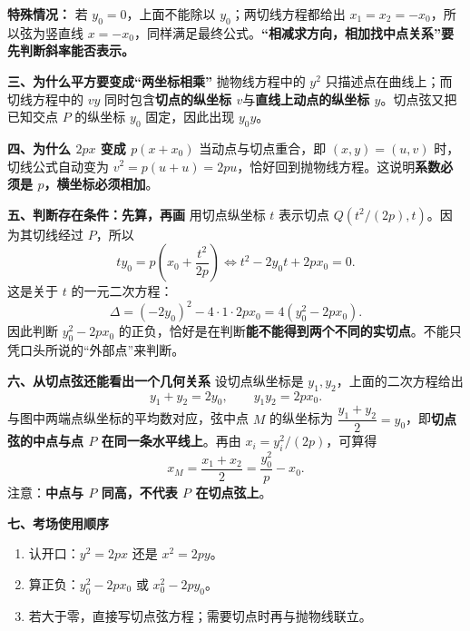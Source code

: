 \begin{explanationbox}
\textbf{特殊情况：} 若 $y_0=0$，上面不能除以 $y_0$；两切线方程都给出 $x_1=x_2=-x_0$，所以弦为竖直线 $x=-x_0$，同样满足最终公式。\textbf{“相减求方向，相加找中点关系”要先判断斜率能否表示。}

\textbf{\textcolor{CExplanation}{三、为什么平方要变成“两坐标相乘”}}
抛物线方程中的 $y^2$ 只描述点在曲线上；而切线方程中的 $vy$ 同时包含\textbf{切点的纵坐标 $v$}与\textbf{直线上动点的纵坐标 $y$}。切点弦又把已知交点 $P$ 的纵坐标 $y_0$ 固定，因此出现 $y_0y$。

\medskip
\textbf{\textcolor{CExplanation}{四、为什么 $2px$ 变成 $p(x+x_0)$}}
当动点与切点重合，即 $(x,y)=(u,v)$ 时，切线公式自动变为 $v^2=p(u+u)=2pu$，恰好回到抛物线方程。这说明\textbf{系数必须是 $p$，横坐标必须相加}。

\medskip
\textbf{\textcolor{CExplanation}{五、判断存在条件：先算，再画}}
用切点纵坐标 $t$ 表示切点 $Q(t^2/(2p),t)$。因为其切线经过 $P$，所以
\[
 t y_0=p\left(x_0+\frac{t^2}{2p}\right)
 \iff t^2-2y_0t+2px_0=0.
\]
这是关于 $t$ 的一元二次方程：
\[
\Delta=(-2y_0)^2-4\cdot 1\cdot 2px_0
=4(y_0^2-2px_0).
\]
因此判断 $y_0^2-2px_0$ 的正负，恰好是在判断\textbf{能不能得到两个不同的实切点}。不能只凭口头所说的“外部点”来判断。

\medskip
\textbf{\textcolor{CExplanation}{六、从切点弦还能看出一个几何关系}}
设切点纵坐标是 $y_1,y_2$，上面的二次方程给出
\[
 y_1+y_2=2y_0,\qquad y_1y_2=2px_0.
\]
与图中两端点纵坐标的平均数对应，弦中点 $M$ 的纵坐标为 $\dfrac{y_1+y_2}{2}=y_0$，即\textbf{切点弦的中点与点 $P$ 在同一条水平线上}。再由 $x_i=y_i^2/(2p)$，可算得
\[
 x_M=\frac{x_1+x_2}{2}=\frac{y_0^2}{p}-x_0.
\]
注意：\textbf{中点与 $P$ 同高，不代表 $P$ 在切点弦上}。

\medskip
\textbf{\textcolor{CExplanation}{七、考场使用顺序}}
\begin{enumerate}[leftmargin=*,itemsep=0.3em]
\item 认开口：$y^2=2px$ 还是 $x^2=2py$。
\item 算正负：$y_0^2-2px_0$ 或 $x_0^2-2py_0$。
\item 若大于零，直接写切点弦方程；需要切点时再与抛物线联立。
\end{enumerate}
\end{explanationbox}
